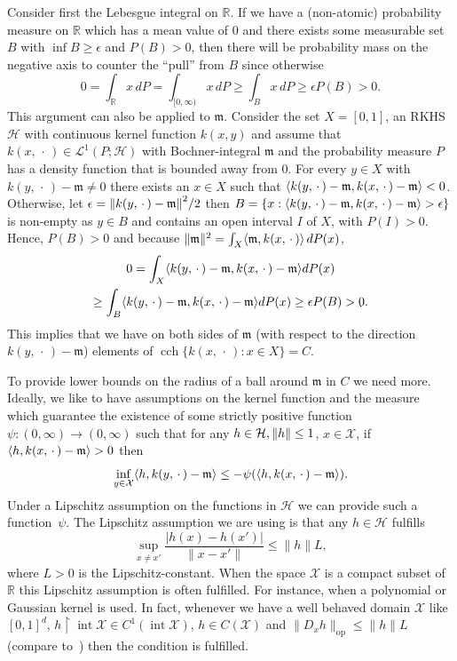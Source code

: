 \documentclass[10pt]{amsart}
\theoremstyle{definition}\newtheorem{defi}[theo]{Definition}\newtheorem{rema}[theo]{Remark}\newtheorem{exam}[theo]{Example}\newtheorem{exem}[theo]{Example}\newtheorem{nota}[theo]{Notation}
\theoremstyle{remark}
\DeclareMathOperator{\cch}{cch}
\DeclareMathOperator{\opp}{op}
\DeclareMathOperator{\intr}{int}
\newcommand{\resttr}
{\!\upharpoonright\!}
\newcommand{\R}{\mathbb{R}}
\newcommand{\X}{\mathcal{X}}
\newcommand{\cH}{\mathcal{H}}
\newcommand{\clL}{\mathcal{L}}
\newcommand{\mean}{\mathfrak{m}}
\providecommand{\norm}[1]{\left\lVert#1\right\rVert}
\providecommand{\inner}[2]{\left\langle #1,#2\right\rangle}
\let\originalleft\left
\let\originalright\right
\renewcommand{\left}{\mathopen{}\mathclose\bgroup\originalleft}
\renewcommand{\right}{\aftergroup\egroup\originalright}
\begin{document}
Consider first the Lebesgue integral on $\R$. If we have a (non-atomic) probability measure on $\R$ which has a mean value of $0$ and there exists some measurable set $B$ with $\inf B \geq \epsilon$ and $P(B) > 0$, then there will be probability mass on the negative axis to counter the ``pull'' from $B$ since otherwise
\[
0 = \int_{\R} x \,dP = \int_{[0,\infty)} x \, dP \geq \int_{B} x \,dP \geq \epsilon P(B) > 0.
\]
This argument can also be applied to $\mean$. Consider the set $X=[0,1]$, an RKHS $\cH$ with continuous kernel function $k(x,y)$ and assume that $k(x,\,\cdot\,) \in \clL^1(P;\cH)$ with Bochner-integral $\mean$ and the probability measure $P$ has a density function that is bounded away from $0$. For every $y \in X$ with $k(y,\,\cdot\,) - \mean \not = 0$ there exists an $x \in X$ such that $\inner{k(y,\,\cdot\,) - \mean}{k(x,\,\cdot\,) - \mean} < 0$. Otherwise, let $\epsilon = \norm{k(y,\,\cdot\,) - \mean}^2/2$ then $B = \{x: \inner{k(y,\,\cdot\,) - \mean}{k(x,\,\cdot\,) - \mean} > \epsilon \}$ is non-empty as $y \in B$ and contains\pagebreak{} an open interval $I$ of $X$, with $P(I)>0$. Hence, $P(B) > 0$ and because $\|\mean\|^2 = \int_X \inner{\mean}{k(x,\,\cdot\,)} \,dP(x)$,
\begin{multline*}
0 =
\int_{X} \inner{k(y,\,\cdot\,) - \mean}{k(x,\,\cdot\,) - \mean} dP(x)\\ \geq \int_B \inner{k(y,\,\cdot\,) - \mean}{k(x,\,\cdot\,) - \mean} dP(x) \geq \epsilon P(B) >0.
\end{multline*}
This implies that we have on both sides of $\mean$ (with respect to the direction $k(y,\,\cdot\,) - \mean$) elements of $\cch \{k(x,\,\cdot\,) : x \in X\} = C$.

To provide lower bounds on the radius of a ball around $\mean$ in $C$ we need more. Ideally, we like to have assumptions on the kernel function and the measure which guarantee the existence of some strictly positive function $\psi:(0,\infty) \rightarrow (0,\infty)$ such that for any $h \in \cH, \norm{h} \leq 1$, $x \in \X$, if $\inner{h}{k(x,\,\cdot\,) - \mean} > 0 $ then
\[
\inf_{y \in \X} \inner{h}{k(y,\,\cdot\,)-\mean} \leq - \psi(\inner{h}{k(x,\,\cdot\,) - \mean}).
\]
Under a Lipschitz assumption on the functions in $\cH$ we can provide such a function~$\psi$. The Lipschitz assumption we are using is that any $h \in \cH$ fulfills
\begin{equation}\label{def:Lip_for_RKHS}
\sup_{x \not = x'} \frac{|h(x) - h(x')|}{\|x-x'\|} \leq \|h\| L,
\end{equation}
where $L >0 $ is the Lipschitz-constant. When the space $\X$ is a compact subset of~$\R$ this Lipschitz assumption is often fulfilled. For instance, when a polynomial or Gaussian kernel is used. In fact, whenever we have a well behaved domain $\X$ like $[0,1]^d$, $h \resttr \intr \X \in C^1(\intr \X)$, $h \in C(\X)$ and $\|D_x h\|_{\opp} \leq \|h\| L$ (compare to~\cite[Corollary~4.36]{STEIN08}) then the condition is fulfilled.
\end{document}
